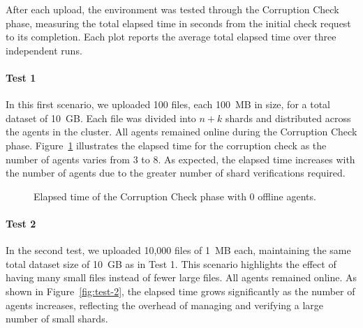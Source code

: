 After each upload, the environment was tested through the Corruption Check phase, measuring the total elapsed time in seconds from the initial check request to its completion. Each plot reports the average total elapsed time over three independent runs.

\paragraph{Test 1}
In this first scenario, we uploaded 100 files, each 100~MB in size, for a total dataset of 10~GB. Each file was divided into $n + k$ shards and distributed across the agents in the cluster. All agents remained online during the Corruption Check phase. Figure~\ref{fig:test-1} illustrates the elapsed time for the corruption check as the number of agents varies from 3 to 8. As expected, the elapsed time increases with the number of agents due to the greater number of shard verifications required.

\begin{figure}[!ht]
\centering
{}
\caption{Elapsed time of the Corruption Check phase with 0 offline agents.}
\label{fig:test-1}
\end{figure}

\newpage
\paragraph{Test 2}
In the second test, we uploaded 10,000 files of 1~MB each, maintaining the same total dataset size of 10~GB as in Test 1. This scenario highlights the effect of having many small files instead of fewer large files. All agents remained online. As shown in Figure~\ref{fig:test-2}, the elapsed time grows significantly as the number of agents increases, reflecting the overhead of managing and verifying a large number of small shards.

